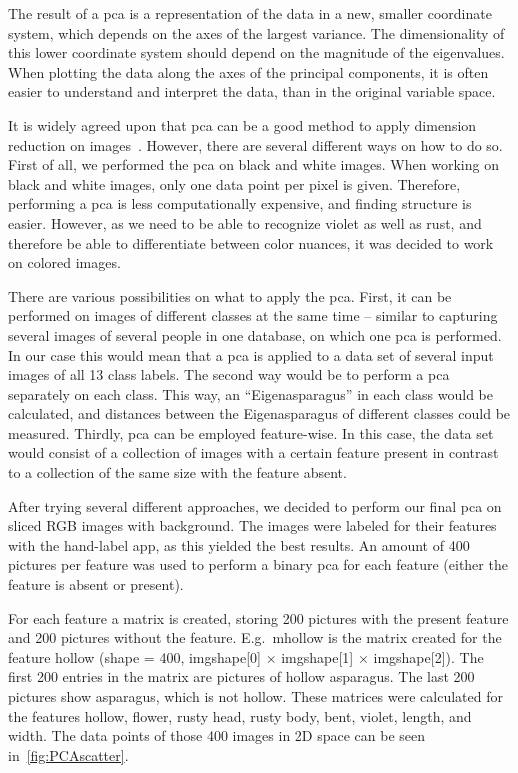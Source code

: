 The result of a \acrshort{pca} is a representation of the data in a new, smaller coordinate system, which depends on the axes of the largest variance. The dimensionality of this lower coordinate system should depend on the magnitude of the eigenvalues. When plotting the data along the axes of the principal components, it is often easier to understand and interpret the data, than in the original variable space.

It is widely agreed upon that \acrshort{pca} can be a good method to apply dimension reduction on images~\citep{turk1991face,lata2009}.
However, there are several different ways on how to do so. First of all, we performed the \acrshort{pca} on black and white images. When working on black and white images, only one data point per pixel is given. Therefore, performing a \acrshort{pca} is less computationally expensive, and finding structure is easier. However, as we need to be able to recognize violet as well as rust, and therefore be able to differentiate between color nuances, it was decided to work on colored images.

\bigskip
There are various possibilities on what to apply the \acrshort{pca}. First, it can be performed on images of different classes at the same time – similar to capturing several images of several people in one database, on which one \acrshort{pca} is performed. In our case this would mean that a \acrshort{pca} is applied to a data set of several input images of all 13 class labels. The second way would be to perform a \acrshort{pca} separately on each class. This way, an \enquote{Eigenasparagus} in each class would be calculated, and distances between the Eigenasparagus of different classes could be measured. Thirdly, \acrshort{pca} can be employed feature-wise. In this case, the data set would consist of a collection of images with a certain feature present in contrast to a collection of the same size with the feature absent.

\bigskip
After trying several different approaches, we decided to perform our final \acrshort{pca} on sliced RGB images with background. The images were labeled for their features with the hand-label app, as this yielded the best results. An amount of 400 pictures per feature was used to perform a binary \acrshort{pca} for each feature (either the feature is absent or present).

For each feature a matrix is created, storing 200 pictures with the present feature and 200 pictures without the feature. E.g.\, m\textunderscore hollow is the matrix created for the feature hollow (shape = 400, img\textunderscore shape[0] $\times$ img\textunderscore shape[1] $\times$ img\textunderscore shape[2]). The first 200 entries in the matrix are pictures of hollow asparagus. The last 200 pictures show asparagus, which is not hollow. These matrices were calculated for the features hollow, flower, rusty head, rusty body, bent, violet, length, and width. The data points of those 400 images in 2D space can be seen in~\autoref{fig:PCAscatter}.

